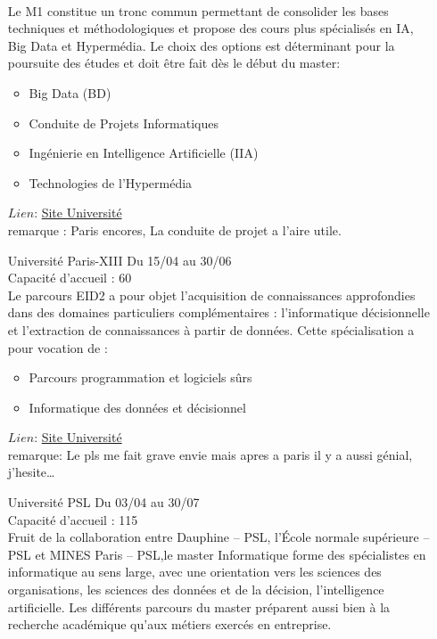 \documentclass[a4paper,11pt]{article}
\newcommand{\e}{\'{e}}
\begin{document}
\begin{enumerate}
                    \\Le M1 constitue un tronc commun permettant de consolider les bases techniques et méthodologiques et propose des cours plus spécialisés en IA, Big Data et Hypermédia.  Le choix des options est déterminant pour la poursuite des études et doit être fait dès le début du master:
                    \begin{itemize}
                        \item Big Data (BD)
                        \item Conduite de Projets Informatiques
                        \item Ingénierie en Intelligence Artificielle (IIA)
                        \item Technologies de l’Hypermédia
                    \end{itemize}
                    $Lien$: \href{https://www.univ-paris8.fr/-Master-Conduite-de-Projets-Informatiques-}{Site Université}
                    \\ remarque : Paris encores, La conduite de projet a l'aire utile.
\\
        \item [\color{LightOrangeHaf}Université Paris-XIII] Du 15/04 au 30/06
                    \\Capacité d'accueil : 60
                    \\Le parcours EID2 a pour objet l’acquisition de connaissances approfondies dans des domaines particuliers complémentaires : l’informatique décisionnelle et l’extraction de connaissances à partir de données. Cette spécialisation a pour vocation de :
                    \begin{itemize}
                        \item Parcours programmation et logiciels sûrs
                        \item Informatique des données et décisionnel 
                    \end{itemize}
                    $Lien$: \href{https://galilee.univ-paris13.fr/master/master-informatique/}{Site Université}
                    \\ remarque: Le pls me fait grave envie mais apres a paris il y a aussi g\e nial, j'hesite\ldots
\\
        \item [\color{LightOrangeHaf}Université PSL] Du 03/04 au 30/07
                    \\Capacité d'accueil : 115
                    \\Fruit de la collaboration entre Dauphine – PSL, l’École normale supérieure – PSL et MINES Paris – PSL,le master Informatique forme des spécialistes en informatique au sens large, avec une orientation vers les sciences des organisations, les sciences des données et de la décision, l’intelligence artificielle.  Les différents parcours du master préparent aussi bien à la recherche académique qu’aux métiers exercés en entreprise. 

\end{enumerate}
\end{document}
